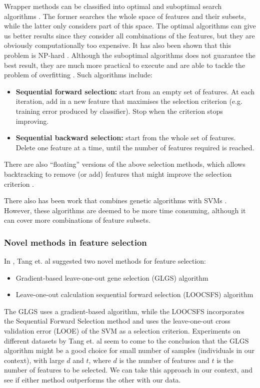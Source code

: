 \documentclass[12pt, twoside, a4paper]{article}
\begin{document}
Wrapper methods can be classified into optimal and suboptimal search algorithms \cite{RefWorks:120}. The former searches the whole space of features and their subsets, while the latter only considers part of this space. The optimal algorithms can give us better results since they consider all combinations of the features, but they are obviously computationally too expensive. It has also been shown that this problem is NP-hard \cite{RefWorks:139}. Although the suboptimal algorithms does not guarantee the best result, they are much more practical to execute and are able to tackle the problem of overfitting \cite{RefWorks:140}. Such algorithms include:
\begin{itemize}
\item \textbf{Sequential forward selection:} start from an empty set of features. At each iteration, add in a new feature that maximises the selection criterion (e.g. training error produced by classifier). Stop when the criterion stops improving.
\item \textbf{Sequential backward selection:} start from the whole set of features. Delete one feature at a time, until the number of features required is reached.
\end{itemize}

There are also ``floating'' versions of the above selection methods, which allows backtracking to remove (or add) features that might improve the selection criterion \cite{RefWorks:121}.

There also has been work that combines genetic algorithms with SVMs \cite{RefWorks:120}. However, these algorithms are deemed to be more time consuming, although it can cover more combinations of feature subsets.

\subsubsection{Novel methods in feature selection} \label{bg_GLGS}
In \cite{RefWorks:119}, Tang et. al suggested two novel methods for feature selection:
\begin{itemize}
\item Gradient-based leave-one-out gene selection (GLGS) algorithm
\item Leave-one-out calculation sequential forward selection (LOOCSFS) algorithm
\end{itemize}

The GLGS uses a gradient-based algorithm, while the LOOCSFS incorporates the Sequential Forward Selection method and uses the leave-one-out cross validation error (LOOE) of the SVM as a selection criterion. Experiments on different datasets by Tang et. al seem to come to the conclusion that the GLGS algorithm might be a good choice for small number of samples (individuals in our context), with large $d$ and $t$, where $d$ is the number of features and $t$ is the number of features to be selected. We can take this approach in our context, and see if either method outperforms the other with our data.
\end{document}
